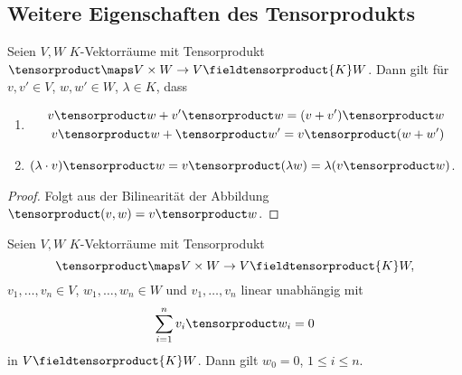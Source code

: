 \subsection*{Weitere Eigenschaften des Tensorprodukts}
\begin{lemma}
  Seien \( V,W \) \( K \)-Vektorräume mit Tensorprodukt \( \tensorproduct\maps V\times W\to V\fieldtensorproduct{K}W \). Dann gilt für \( v,v'\in V \), \( w,w'\in W \), \( \lambda\in K \), dass 
  \begin{enumerate}
    \item \label{tensorprodukt:distributiv}
    \begin{align*}
      v\tensorproduct w+v'\tensorproduct w=(v+v')\tensorproduct w\\
      v\tensorproduct w+\tensorproduct w'=v\tensorproduct (w+w')
    \end{align*}
    \item \( (\lambda\cdot v)\tensorproduct w=v\tensorproduct (\lambda w)=\lambda (v \tensorproduct w) \).
  \end{enumerate}
\end{lemma}
\begin{proof}
  Folgt aus der Bilinearität der Abbildung \( \tensorproduct(v,w)=v\tensorproduct w \).
\end{proof}
\begin{lemma}
  Seien \( V,W \) \( K \)-Vektorräume mit Tensorprodukt
  \begin{equation*}
    \tensorproduct\maps V\times W\to V\fieldtensorproduct{K} W,
  \end{equation*}
  \( v_1,\dotsc,v_n\in V \), \( w_1,\dotsc,w_n\in W \) und \( v_1,\dotsc,v_n \) linear unabhängig mit
  \begin{equation*}
    \sum_{i=1}^{n}v_i\tensorproduct w_i=0
  \end{equation*}
  in \( V\fieldtensorproduct{K}W \). Dann gilt \( w_0=0 \), \( 1\leq i\leq n \).
\end{lemma}
